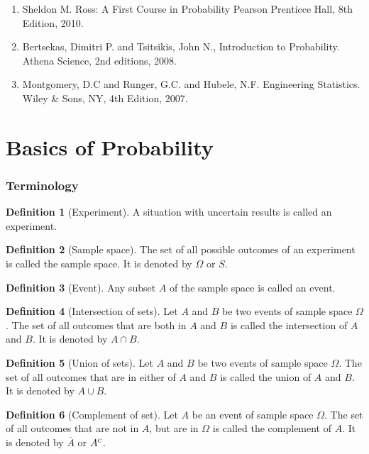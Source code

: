 \documentclass[titlepage, fleqn, a4paper, 12pt, twoside]{article}
\theoremstyle{definition}
\newtheorem{definition}{Definition}
\theoremstyle{theorem}
\DeclareMathOperator{\comp}{\textsc{c}}
\begin{document}
\begin{enumerate}
	\item Sheldon M. Ross: A First Course in Probability Pearson Prenticce Hall, 8th Edition, 2010.
	\item Bertsekas, Dimitri P. and Tsitsikis, John N., Introduction to Probability. Athena Science, 2nd editions, 2008.
	\item Montgomery, D.C and Runger, G.C. and Hubele, N.F. Engineering Statistics. Wiley \& Sons, NY, 4th Edition, 2007.
\end{enumerate}

\clearpage
{}

\part{Basics of Probability}

\section{Terminology}

\begin{definition}[Experiment]
	A situation with uncertain results is called an experiment.
\end{definition}

\begin{definition}[Sample space]
	The set of all possible outcomes of an experiment is called the sample space.
	It is denoted by $\Omega$ or $S$.
\end{definition}

\begin{definition}[Event]
	Any subset $A$ of the sample space is called an event.
\end{definition}

\begin{definition}[Intersection of sets]
	Let $A$ and $B$ be two events of sample space $\Omega$.
	The set of all outcomes that are both in $A$ and $B$ is called the intersection of $A$ and $B$.
	It is denoted by $A \cap B$.
\end{definition}

\begin{definition}[Union of sets]
	Let $A$ and $B$ be two events of sample space $\Omega$.
	The set of all outcomes that are in either of $A$ and $B$ is called the union of $A$ and $B$.
	It is denoted by $A \cup B$.
\end{definition}

\begin{definition}[Complement of set]
	Let $A$ be an event of sample space $\Omega$.
	The set of all outcomes that are not in $A$, but are in $\Omega$ is called the complement of $A$.
	It is denoted by $\overline{A}$ or $A^{\comp}$.
\end{definition}
\end{document}
